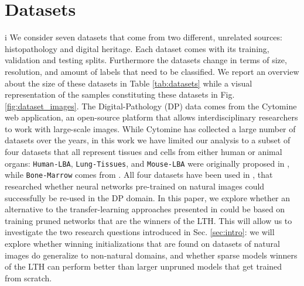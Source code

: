 \section{Datasets}
\label{sec:datasets}
i
We consider seven datasets that come from two different, unrelated sources: histopathology and digital heritage. Each dataset comes with its training, validation and testing splits. Furthermore the datasets change in terms of size, resolution, and amount of labels that need to be classified.
We report an overview about the size of these datasets in Table \ref{tab:datasets} while a visual representation of the samples constituting these datasets in Fig. \ref{fig:dataset_images}.
The Digital-Pathology (DP) data comes from the Cytomine \cite{maree2016collaborative} web application, an open-source platform that allows interdisciplinary researchers to work with large-scale images. While Cytomine has collected a large number of datasets over the years, in this work we have limited our analysis to a subset of four datasets that all represent tissues and cells from either human or animal organs: \texttt{Human-LBA}, \texttt{Lung-Tissues}, and \texttt{Mouse-LBA} were originally proposed in \cite{mormont2018comparison}, while \texttt{Bone-Marrow} comes from \cite{kainz2017training}. All four datasets have been used in \cite{mormont2018comparison}, that researched whether neural networks pre-trained on natural images could successfully be re-used in the DP domain. In this paper, we explore whether an alternative to the transfer-learning approaches presented in \cite{mormont2018comparison} could be based on training pruned networks that are the winners of the LTH. This will allow us to investigate the two research questions introduced in Sec. \ref{sec:intro}: we will explore whether winning initializations that are found on datasets of natural images do generalize to non-natural domains, and whether sparse models winners of the LTH can perform better than larger unpruned models that get trained from scratch. 
